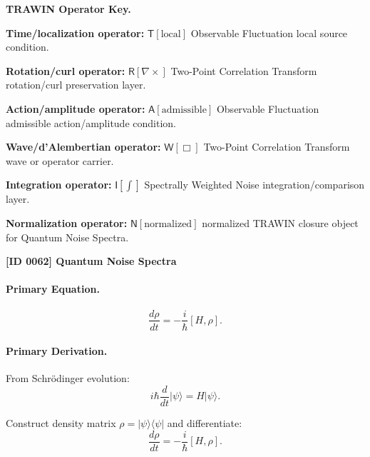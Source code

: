 \par\vspace{0.45\baselineskip}
\noindent\begin{minipage}[t]{\linewidth}
\begingroup
\small
\raggedright
\textbf{TRAWIN Operator Key.}\par
\noindent\textbf{Time/localization operator:} $\mathsf{T}\!\left[\mathrm{local}\right]$ Observable Fluctuation local source condition.\par
\noindent\textbf{Rotation/curl operator:} $\mathsf{R}\!\left[\nabla\times\right]$ Two-Point Correlation Transform rotation/curl preservation layer.\par
\noindent\textbf{Action/amplitude operator:} $\mathsf{A}\!\left[\mathrm{admissible}\right]$ Observable Fluctuation admissible action/amplitude condition.\par
\noindent\textbf{Wave/d'Alembertian operator:} $\mathsf{W}\!\left[\Box\right]$ Two-Point Correlation Transform wave or operator carrier.\par
\noindent\textbf{Integration operator:} $\mathsf{I}\!\left[\int\right]$ Spectrally Weighted Noise integration/comparison layer.\par
\noindent\textbf{Normalization operator:} $\mathsf{N}\!\left[\mathrm{normalized}\right]$ normalized TRAWIN closure object for Quantum Noise Spectra.\par
\endgroup
\end{minipage}

\clearpage
\noindent\textbf{[ID 0062] Quantum Noise Spectra}\par
\vspace{0.35em}
\paragraph{Primary Equation.}
\begin{equation}
\frac{d\rho}{dt} = -\frac{i}{\hbar}[H,\rho].
\end{equation}

\paragraph{Primary Derivation.}
From Schrödinger evolution:
\begin{equation}
i\hbar \frac{d}{dt}|\psi\rangle = H|\psi\rangle.
\end{equation}

Construct density matrix $\rho = |\psi\rangle\langle \psi|$ and differentiate:
\begin{equation}
\frac{d\rho}{dt} = -\frac{i}{\hbar}[H,\rho].
\end{equation}

